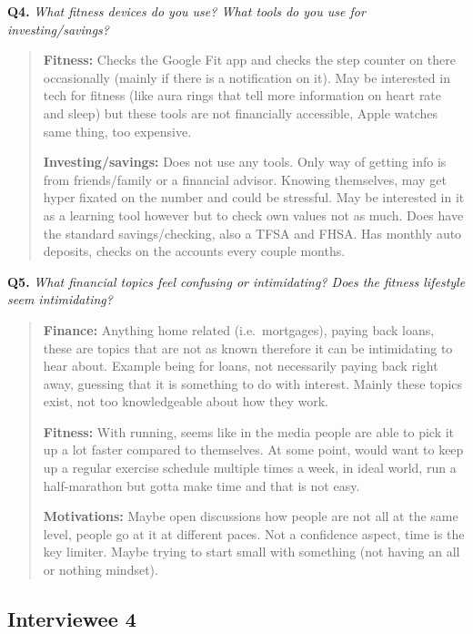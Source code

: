 \documentclass[12pt]{article}
\begin{document}
\medskip
\noindent\textbf{Q4.} \textit{What fitness devices do you use? What tools do you use for investing/savings?}

\begin{quote}
\textbf{Fitness:} Checks the Google Fit app and checks the step counter on there occasionally (mainly if there is a notification on it). May be interested in tech for fitness (like aura rings that tell more information on heart rate and sleep) but these tools are not financially accessible, Apple watches same thing, too expensive.\par
\textbf{Investing/savings:} Does not use any tools. Only way of getting info is from friends/family or a financial advisor. Knowing themselves, may get hyper fixated on the number and could be stressful. May be interested in it as a learning tool however but to check own values not as much. Does have the standard savings/checking, also a TFSA and FHSA. Has monthly auto deposits, checks on the accounts every couple months.\par
\end{quote}

\medskip
\noindent\textbf{Q5.} \textit{What financial topics feel confusing or intimidating? Does the fitness lifestyle seem intimidating?}

\begin{quote}
\textbf{Finance:} Anything home related (i.e.\ mortgages), paying back loans, these are topics that are not as known therefore it can be intimidating to hear about. Example being for loans, not necessarily paying back right away, guessing that it is something to do with interest. Mainly these topics exist, not too knowledgeable about how they work.\par
\textbf{Fitness:} With running, seems like in the media people are able to pick it up a lot faster compared to themselves. At some point, would want to keep up a regular exercise schedule multiple times a week, in ideal world, run a half-marathon but gotta make time and that is not easy.\par
\textbf{Motivations:} Maybe open discussions how people are not all at the same level, people go at it at different paces. Not a confidence aspect, time is the key limiter. Maybe trying to start small with something (not having an all or nothing mindset).\par
\end{quote}

\subsection{Interviewee 4}
\end{document}
